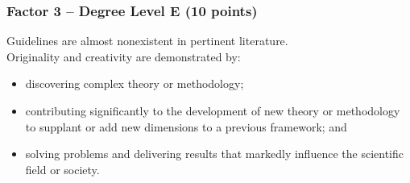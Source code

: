 \subsubsection*{Factor 3 -- Degree Level E (10 points)}

Guidelines are almost nonexistent in pertinent literature.\\
Originality and creativity are demonstrated by:

\begin{itemize}
\item discovering complex theory or methodology; 
\item contributing significantly to the development of new theory or methodology to supplant or 
add new dimensions to a previous framework; and 
\item solving problems and delivering results that markedly influence the scientific field or society.
\end{itemize}